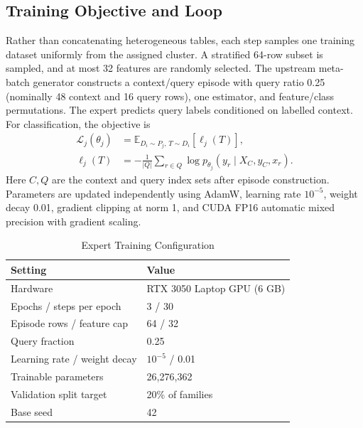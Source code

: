\documentclass[conference]{IEEEtran}
\begin{document}
\subsection{Training Objective and Loop}
Rather than concatenating heterogeneous tables, each step samples one training dataset uniformly from the assigned cluster. A stratified 64-row subset is sampled, and at most 32 features are randomly selected. The upstream meta-batch generator constructs a context/query episode with query ratio 0.25 (nominally 48 context and 16 query rows), one estimator, and feature/class permutations. The expert predicts query labels conditioned on labelled context. For classification, the objective is
\begin{equation}
\begin{aligned}
\mathcal L_j(\theta_j)&=\mathbb E_{D_i\sim P_j,\,T\sim D_i}[\ell_j(T)],\\
\ell_j(T)&=-\frac{1}{|Q|}\sum_{r\in Q}\log p_{\theta_j}(y_r\mid X_C,y_C,x_r).
\end{aligned}
\end{equation}
Here $C,Q$ are the context and query index sets after episode construction. Parameters are updated independently using AdamW, learning rate $10^{-5}$, weight decay 0.01, gradient clipping at norm 1, and CUDA FP16 automatic mixed precision with gradient scaling.

\begin{table}[t]
\caption{Expert Training Configuration}
\centering\footnotesize
\begin{tabular}{ll}\toprule
Setting & Value\\\midrule
Hardware & RTX 3050 Laptop GPU (6 GB)\\
Epochs / steps per epoch & 3 / 30\\
Episode rows / feature cap & 64 / 32\\
Query fraction & 0.25\\
Learning rate / weight decay & $10^{-5}$ / 0.01\\
Trainable parameters & 26,276,362\\
Validation split target & 20\% of families\\
Base seed & 42\\\bottomrule
\end{tabular}
\end{table}
\end{document}
